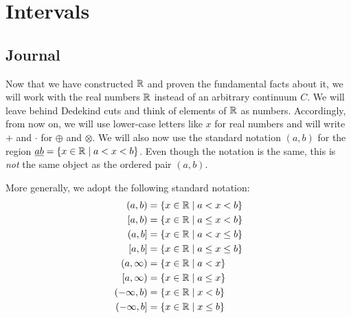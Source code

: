 \documentclass[../main.tex]{subfiles}
\begin{document}
\chapter{Intervals}\label{sct:8}
\section{Journal}
Now that we have constructed $\mathbb{R}$ and proven the fundamental facts about it, we will work with the real numbers $\mathbb{R}$ instead of an arbitrary continuum $C$. We will leave behind Dedekind cuts and think of elements of $\mathbb{R}$ as numbers. Accordingly, from now on, we will use lower-case letters like $x$ for real numbers and will write $+$ and $\cdot$ for $\oplus$ and $\otimes$. We will also now use the standard notation $(a,b)$ for the region $\underline{ab}=\{x\in\mathbb{R}\mid a<x<b\}$. Even though the notation is the same, this is \emph{not} the same object as the ordered pair $(a,b)$.\par
More generally, we adopt the following standard notation:
\begin{align}
    \begin{split}
        (a,b) &= \{x\in\R\mid a<x<b\}\\
        [a,b) &= \{x\in\R\mid a\leq x<b\}\\
        (a,b] &= \{x\in\R\mid a<x\leq b\}\\
        [a,b] &= \{x\in\R\mid a\leq x\leq b\}\\
        (a,\infty) &= \{x\in\R\mid a<x\}\\
        [a,\infty) &= \{x\in\R\mid a\leq x\}\\
        (-\infty,b) &= \{x\in\R\mid x<b\}\\
        (-\infty,b] &= \{x\in\R\mid x\leq b\}
    \end{split}\label{eqn:8.1}
\end{align}
\end{document}

